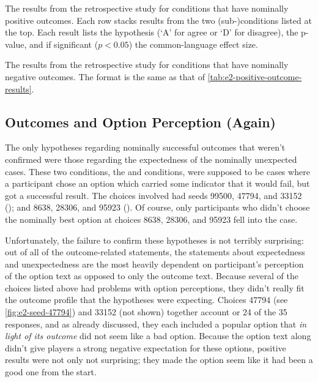 \begin{table}[!p]
\centering
\bgroup
\def\arraystretch{1.2}
\setlength{\tabcolsep}{0.4em}

\egroup
\caption[Retrospective positive outcome results]{The results from the retrospective study for conditions that have nominally positive outcomes. Each row stacks results from the two (sub-)conditions listed at the top. Each result lists the hypothesis (`A' for agree or `D' for disagree), the p-value, and if significant ($p < 0.05$) the common-language effect size.}
  \label{tab:e2-positive-outcome-results}
\end{table}

\begin{table}[!p]
\centering
\bgroup
\def\arraystretch{1.2}
\setlength{\tabcolsep}{0.4em}

\egroup
\caption[Retrospective negative outcome results]{The results from the retrospective study for conditions that have nominally negative outcomes. The format is the same as that of \cref{tab:e2-positive-outcome-results}.}
\label{tab:e2-negative-outcome-results}
\end{table}


\subsection{Outcomes and Option Perception (Again)}

The only hypotheses regarding nominally successful outcomes that weren't confirmed were those regarding the expectedness of the nominally unexpected cases.
%
These two conditions, the \unxs{} and \obvfa{} conditions, were supposed to be cases where a participant chose an option which carried some indicator that it would fail, but got a successful result.
%
The choices involved had seeds 99500, 47794, and 33152 (\unxs{}); and 8638, 28306, and 95923 (\obvf{}).
%
Of course, only participants who didn't choose the nominally best option at choices 8638, 28306, and 95923 fell into the \obvfa{} case.


Unfortunately, the failure to confirm these hypotheses is not terribly surprising: out of all of the outcome-related statements, the statements about expectedness and unexpectedness are the most heavily dependent on participant's perception of the option text as opposed to only the outcome text.
%
Because several of the choices listed above had problems with option perceptions, they didn't really fit the outcome profile that the hypotheses were expecting.
%
Choices 47794 (see \cref{fig:e2-seed-47794}) and 33152 (not shown) together account or 24 of the 35 \unxs{} responses, and as already discussed, they each included a popular option that \emph{in light of its outcome} did not seem like a bad option.
%
Because the option text along didn't give players a strong negative expectation for these options, positive results were not only not surprising; they made the option seem like it had been a good one from the start.


